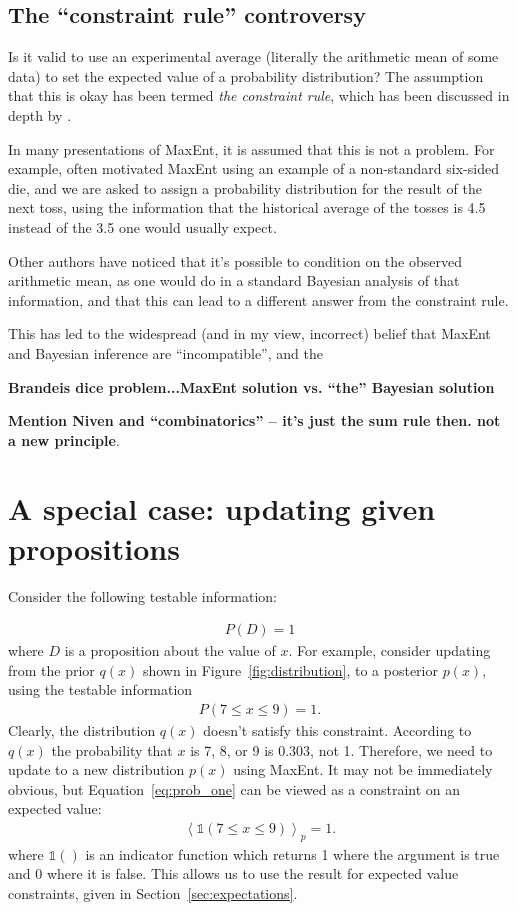 \documentclass[a4paper, 11pt]{article}
\begin{document}
\subsection{The ``constraint rule'' controversy}
Is it valid to use an experimental average (literally the arithmetic mean of
some data) to set the expected value of a probability distribution? The
assumption that this is okay has been termed {\it the constraint rule}, which
has been discussed in depth by \citet{uffink}.

In many presentations of MaxEnt, it is assumed that this is not a problem.
For example, \citet{jaynes} often motivated MaxEnt using an example of a
non-standard six-sided die, and we are asked to assign a probability
distribution for the result of the next toss, using the information that the
historical average of the tosses is 4.5 instead of the 3.5 one would
usually expect.


Other authors have noticed that it's possible to
condition on the observed arithmetic mean, as one would do in a standard
Bayesian analysis of that information, and that this can lead to a different
answer from the constraint rule.


This has led to the widespread (and in my view, incorrect) belief that
MaxEnt and Bayesian inference are ``incompatible'', and the 

{\bf Brandeis dice problem...MaxEnt solution vs. ``the'' Bayesian solution}


{\bf Mention Niven and ``combinatorics'' -- it's just the sum rule then. not
a new principle}.

\section{A special case: updating given propositions}
Consider the following testable information:

\begin{eqnarray}
P(D) = 1
\end{eqnarray}
where $D$ is a proposition about the value of $x$. For example, consider
updating from the prior $q(x)$ shown in Figure~\ref{fig:distribution}, to
a posterior $p(x)$, using the testable information
\begin{eqnarray}
P(7 \leq x \leq 9) = 1.\label{eq:prob_one}
\end{eqnarray}
Clearly, the distribution $q(x)$ doesn't satisfy this constraint. According
to $q(x)$ the probability that $x$ is 7, 8, or 9 is 0.303, not 1.
Therefore, we
need to update to a new distribution $p(x)$ using MaxEnt. It may not be
immediately obvious, but Equation~\ref{eq:prob_one} can be viewed as
a constraint on an expected value:
\begin{eqnarray}
\left<
\mathds{1}\left(7 \leq x \leq 9\right)
\right>_p = 1.
\end{eqnarray}
where $\mathds{1}()$ is an indicator function which returns 1 where the
argument is true and 0 where it is false. This allows us to use the
result for expected value constraints, given in
Section~\ref{sec:expectations}.
\end{document}
